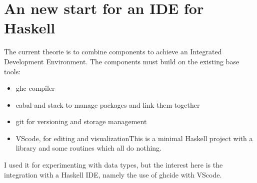 \documentclass[a4paper,10pt]{scrbook}
\providecommand{\tightlist}{%
\setlength{\itemsep}{0pt}\setlength{\parskip}{0pt}}
\begin{document}
\hypertarget{an-new-start-for-an-ide-for-haskell}{%
\section{An new start for an IDE for
Haskell}\label{an-new-start-for-an-ide-for-haskell}}

The current theorie is to combine components to achieve an Integrated
Development Environment. The components must build on the existing base
tools:

\begin{itemize}
\tightlist
\item
  ghc compiler
\item
  cabal and stack to manage packages and link them together
\item
  git for versioning and storage management
\item
  VScode, for editing and visualizationThis is a minimal Haskell project
  with a library and some routines which all do nothing.
\end{itemize}

I used it for experimenting with data types, but the interest here is
the integration with a Haskell IDE, namely the use of ghcide with
VScode.

\printindex
\end{document}

